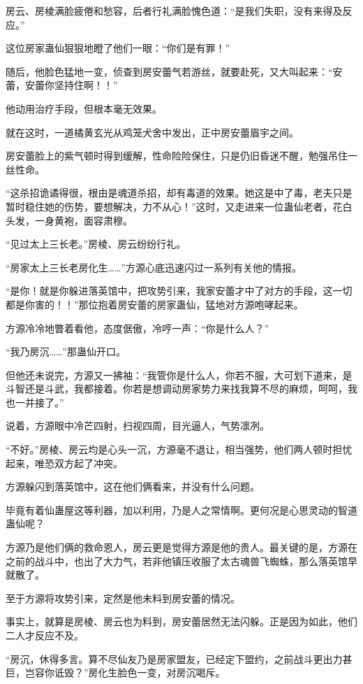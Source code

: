 \begin{this_body}
房云、房棱满脸疲倦和愁容，后者行礼满脸愧色道：“是我们失职，没有来得及反应。”

这位房家蛊仙狠狠地瞪了他们一眼：“你们是有罪！”

随后，他脸色猛地一变，侦查到房安蕾气若游丝，就要赴死，又大叫起来：“安蕾，安蕾你坚持住啊！！”

他动用治疗手段，但根本毫无效果。

就在这时，一道橘黄玄光从鸡笼犬舍中发出，正中房安蕾眉宇之间。

房安蕾脸上的紫气顿时得到缓解，性命险险保住，只是仍旧昏迷不醒，勉强吊住一丝性命。

“这杀招诡谲得很，根由是魂道杀招，却有毒道的效果。她这是中了毒，老夫只是暂时稳住她的伤势，要想解决，力不从心！”这时，又走进来一位蛊仙老者，花白头发，一身黄袍，面容肃穆。

“见过太上三长老。”房棱、房云纷纷行礼。

“房家太上三长老房化生……”方源心底迅速闪过一系列有关他的情报。

“是你！就是你躲进落英馆中，把攻势引来，我家安蕾才中了对方的手段，这一切都是你害的！！”那位抱着房安蕾的房家蛊仙，猛地对方源咆哮起来。

方源冷冷地瞥着看他，态度倨傲，冷哼一声：“你是什么人？”

“我乃房沉……”那蛊仙开口。

但他还未说完，方源又一拂袖：“我管你是什么人，你若不服，大可划下道来，是斗智还是斗武，我都接着。你若是想调动房家势力来找我算不尽的麻烦，呵呵，我也一并接了。”

说着，方源眼中冷芒四射，扫视四周，目光逼人，气势凛冽。

“不好。”房棱、房云均是心头一沉，方源毫不退让，相当强势，他们两人顿时担忧起来，唯恐双方起了冲突。

方源躲闪到落英馆中，这在他们俩看来，并没有什么问题。

毕竟有着仙蛊屋这等利器，加以利用，乃是人之常情啊。更何况是心思灵动的智道蛊仙呢？

方源乃是他们俩的救命恩人，房云更是觉得方源是他的贵人。最关键的是，方源在之前的战斗中，也出了大力气，若非他镇压收服了太古魂兽飞蜘蛛，那么落英馆早就散了。

至于方源将攻势引来，定然是他未料到房安蕾的情况。

事实上，就算是房棱、房云也为料到，房安蕾居然无法闪躲。正是因为如此，他们二人才反应不及。

“房沉，休得多言。算不尽仙友乃是房家盟友，已经定下盟约，之前战斗更出力甚巨，岂容你诋毁？”房化生脸色一变，对房沉喝斥。


\end{this_body}
